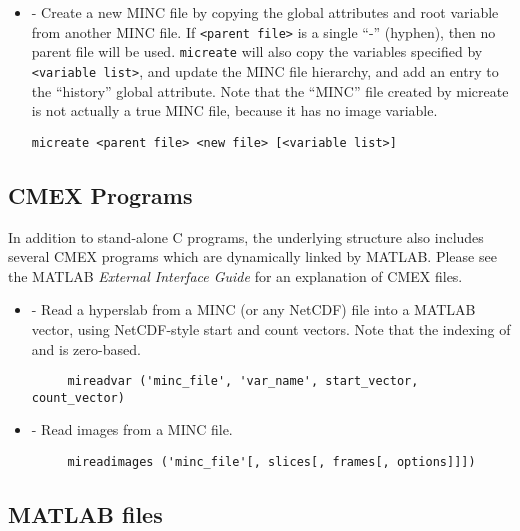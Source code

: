 \begin {itemize}
\item {} - Create a new MINC file by copying the global
attributes and root variable from another MINC file.  If
\verb|<parent file>| is a single ``-'' (hyphen), then no parent file
will be used.  \verb|micreate| will also copy the variables specified
by \verb|<variable list>|, and update the MINC file hierarchy, and
add an entry to the ``history'' global attribute.  Note that the
``MINC'' file created by micreate is not actually a true MINC file,
because it has no image variable.
\begin{verbatim}
micreate <parent file> <new file> [<variable list>]
\end{verbatim}

\end{itemize}


\subsection{CMEX Programs}

In addition to stand-alone C programs, the underlying structure also includes
several CMEX programs which are dynamically linked by MATLAB.  Please see the
MATLAB {\em External Interface Guide} for an explanation of CMEX files.

\begin{itemize}

\item {} - Read a hyperslab from a MINC (or any NetCDF)
file into a MATLAB vector, using NetCDF-style start and count
vectors.  Note that the indexing of  and
 is zero-based.
\begin{verbatim}
     mireadvar ('minc_file', 'var_name', start_vector, count_vector)
\end{verbatim}

\item {} - Read images from a MINC file.
\begin{verbatim}
     mireadimages ('minc_file'[, slices[, frames[, options]]]) 
\end{verbatim}

\end{itemize}

\newpage
\subsection{MATLAB files}
\label{emma_reference}





